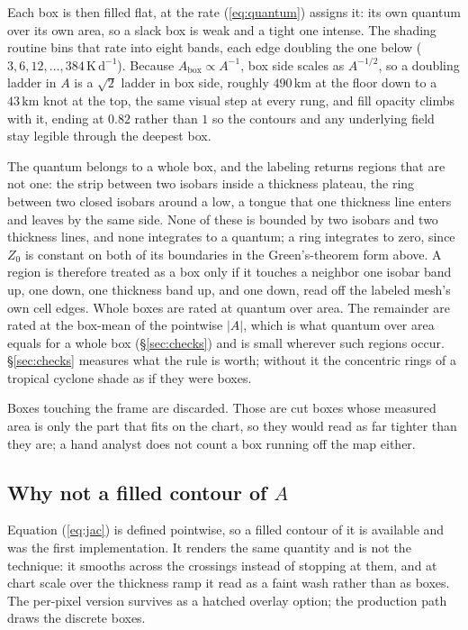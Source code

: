 \documentclass[11pt]{article}
\newcommand{\km}{\ensuremath{\,\mathrm{km}}}
\newcommand{\Kday}{\ensuremath{\,\mathrm{K\,d^{-1}}}}
\begin{document}
Each box is then filled flat, at the rate (\ref{eq:quantum}) assigns it: its own quantum over its own area, so a slack box is weak and a tight one intense. The shading routine bins that rate into eight bands, each edge doubling the one below ($3, 6, 12, \ldots, 384\Kday$). Because $A_{\mathrm{box}} \propto A^{-1}$, box side scales as $A^{-1/2}$, so a doubling ladder in $A$ is a $\sqrt{2}$ ladder in box side, roughly $490\km$ at the floor down to a $43\km$ knot at the top, the same visual step at every rung, and fill opacity climbs with it, ending at $0.82$ rather than $1$ so the contours and any underlying field stay legible through the deepest box.

The quantum belongs to a whole box, and the labeling returns regions that are not one: the strip between two isobars inside a thickness plateau, the ring between two closed isobars around a low, a tongue that one thickness line enters and leaves by the same side. None of these is bounded by two isobars and two thickness lines, and none integrates to a quantum; a ring integrates to zero, since $Z_0$ is constant on both of its boundaries in the Green's-theorem form above. A region is therefore treated as a box only if it touches a neighbor one isobar band up, one down, one thickness band up, and one down, read off the labeled mesh's own cell edges. Whole boxes are rated at quantum over area. The remainder are rated at the box-mean of the pointwise $|A|$, which is what quantum over area equals for a whole box (\S\ref{sec:checks}) and is small wherever such regions occur. \S\ref{sec:checks} measures what the rule is worth; without it the concentric rings of a tropical cyclone shade as if they were boxes.

Boxes touching the frame are discarded. Those are cut boxes whose measured area is only the part that fits on the chart, so they would read as far tighter than they are; a hand analyst does not count a box running off the map either.

\subsection{Why not a filled contour of $A$}

Equation (\ref{eq:jac}) is defined pointwise, so a filled contour of it is available and was the first implementation. It renders the same quantity and is not the technique: it smooths across the crossings instead of stopping at them, and at chart scale over the thickness ramp it read as a faint wash rather than as boxes. The per-pixel version survives as a hatched overlay option; the production path draws the discrete boxes.
\end{document}

